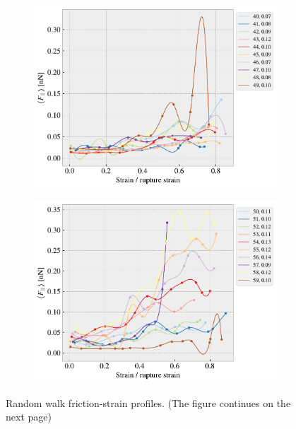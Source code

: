 \begin{figure}[H]
\begin{subfigure}[b]{0.49\textwidth}
        \includegraphics[width=\textwidth]{figures/stretch_profiles/RW/SP_4_RW.pdf}
        \caption{}
    \end{subfigure}
    \hfill
    \begin{subfigure}[b]{0.49\textwidth}
        \centering
        \includegraphics[width=\textwidth]{figures/stretch_profiles/RW/SP_5_RW.pdf}
        \caption{}
    \end{subfigure}
    \hfill
    \caption{Random walk friction-strain profiles. (The figure continues on the next page)}
\end{figure}


